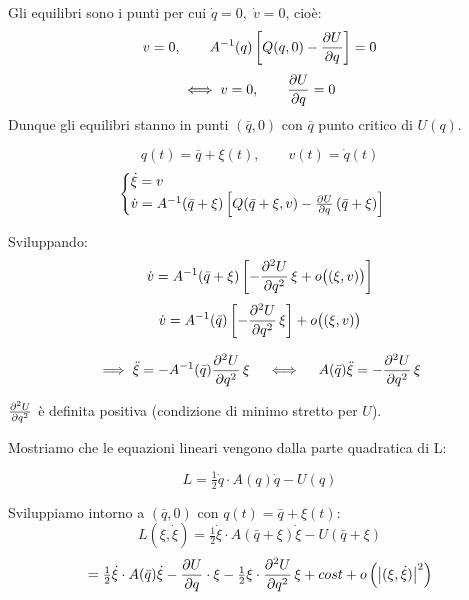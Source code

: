 Gli equilibri sono i punti per cui $\dot{q}=0, \; \dot{v}=0$, cioè:
\begin{equation}
    v=0, \qquad A^{-1}(q)\left[ Q(q,0) - \pdv{U}{q} \right] = 0
\end{equation}
\begin{equation}
    \iff v=0, \qquad \pdv{U}{q}=0
\end{equation}
Dunque gli equilibri stanno in punti $(\bar{q},0)$ con $\bar{q}$ punto critico di $U(q)$.


\begin{equation}
    q(t) = \bar{q} + \xi(t), \qquad v(t) = \dot{q}(t)
\end{equation}
\begin{equation}
\begin{cases}
    \dot{\xi} = v \\
    \dot{v} = A^{-1}(\bar{q}+\xi)\left[ Q(\bar{q}+\xi,v) - \pdv{U}{q} \left(\bar{q}+\xi\right) \right]
\end{cases}
\end{equation}

Sviluppando:
\begin{equation}
    \dot{v} = A^{-1}(\bar{q}+\xi)\left[ - \pdv[2]{U}{q}(\bar{q})\,\xi + o\big((\xi,v)\big) \right]
\end{equation}
\begin{equation}
    \dot{v} = A^{-1}(\bar{q})\left[ - \pdv[2]{U}{q}(\bar{q})\,\xi \right] + o\big((\xi,v)\big)
\end{equation}

\begin{equation}
    \implies \ddot{\xi} = - A^{-1}(\bar{q}) \pdv[2]{U}{q}(\bar{q})\,\xi
    \quad\iff\quad
    A(\bar{q})\ddot{\xi} = - \pdv[2]{U}{q}(\bar{q})\,\xi
\end{equation}

\begin{remark}
    \(\pdv[2]{U}{q}(\bar{q})\) è definita positiva (condizione di minimo stretto per \(U\)).
\end{remark}

Mostriamo che le equazioni lineari vengono dalla parte quadratica di L:

\begin{equation}
    L = \tfrac{1}{2}\dot{q}\cdot A(q)\dot{q} - U(q)
\end{equation}

Sviluppiamo intorno a $(\bar{q},0)$ con $q(t)=\bar{q}+\xi(t)$:
\begin{equation}
    L(\xi,\dot{\xi}) = \tfrac{1}{2}\dot{\xi}\cdot A(\bar{q}+\xi)\dot{\xi} - U(\bar{q}+\xi)
\end{equation}
\begin{equation}
    = \tfrac{1}{2}\dot{\xi}\cdot A(\bar{q})\dot{\xi} 
    - \pdv{U}{q}(\bar{q})\cdot \xi 
    - \tfrac{1}{2}\xi\cdot \pdv[2]{U}{q}(\bar{q})\,\xi
    + cost
    + o\left(\abs{(\xi,\dot{\xi})}^2\right)
\end{equation}

